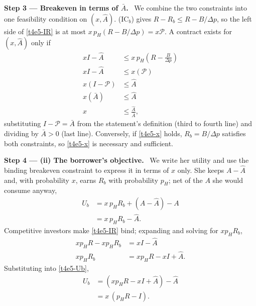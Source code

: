 \documentclass[11pt,a4paper]{article}
\newcommand{\step}[2]{\par\medskip\noindent\textbf{Step #1 --- #2.}~}
\begin{document}
\step{3}{Breakeven in terms of $\bar A$} We combine the two constraints into one feasibility
condition on $(x,\hat A)$. (IC$_b$) gives $R-R_b\le R-B/\Delta p$, so the
left side of \eqref{t4e5-IR} is at most $x\,p_H(R-B/\Delta p)=x\mathcal P$. A contract exists for $(x,\hat A)$ only if
\begin{align}
  x I-\hat A &\le x\,p_H\left(R-\frac{B}{\Delta p}\right) \nonumber\\
  x I-\hat A &\le x(\mathcal P) \nonumber\\
  x(I-\mathcal P) &\le \hat A \nonumber\\
  x(\bar A) &\le \hat A \nonumber\\
  x &\le \frac{\hat A}{\bar A}, \label{t4e5-x}
\end{align}
substituting $I-\mathcal P=\bar A$ from the statement's definition (third to fourth line) and
dividing by $\bar A>0$ (last line). Conversely, if \eqref{t4e5-x} holds, $R_b=B/\Delta p$ satisfies
both constraints, so \eqref{t4e5-x} is necessary and sufficient.

\step{4}{(ii) The borrower's objective} We write her utility and use the binding breakeven
constraint to express it in terms of $x$ only. She keeps $A-\hat A$ and, with probability $x$, earns
$R_b$ with probability $p_H$; net of the $A$ she would consume anyway,
\begin{align}
  U_b &= x\,p_H R_b+(A-\hat A)-A \nonumber\\
      &= x\,p_H R_b-\hat A. \label{t4e5-Ub}
\end{align}
Competitive investors make \eqref{t4e5-IR} bind; expanding and solving for $x p_H R_b$,
\begin{align}
  x p_H R-x p_H R_b &= xI-\hat A \nonumber\\
  x p_H R_b &= x p_H R-xI+\hat A. \nonumber
\end{align}
Substituting into \eqref{t4e5-Ub},
\begin{align}
  U_b &= (x p_H R-xI+\hat A)-\hat A \nonumber\\
      &= x\,(p_H R-I). \label{t4e5-Ubx}
\end{align}
\end{document}
